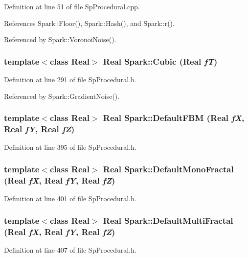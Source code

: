 Definition at line 51 of file Sp\-Procedural.cpp.

References Spark::Floor(), Spark::Hash(), and Spark::r().

Referenced by Spark::Voronoi\-Noise().
\subsubsection{\setlength{\rightskip}{0pt plus 5cm}template$<$class Real$>$ Real Spark::Cubic (Real {\em f\-T})}\label{namespaceSpark_a98}


Definition at line 291 of file Sp\-Procedural.h.

Referenced by Spark::Gradient\-Noise().
\subsubsection{\setlength{\rightskip}{0pt plus 5cm}template$<$class Real$>$ Real Spark::Default\-FBM (Real {\em f\-X}, Real {\em f\-Y}, Real {\em f\-Z})}\label{namespaceSpark_a86}


Definition at line 395 of file Sp\-Procedural.h.
\subsubsection{\setlength{\rightskip}{0pt plus 5cm}template$<$class Real$>$ Real Spark::Default\-Mono\-Fractal (Real {\em f\-X}, Real {\em f\-Y}, Real {\em f\-Z})}\label{namespaceSpark_a87}


Definition at line 401 of file Sp\-Procedural.h.
\subsubsection{\setlength{\rightskip}{0pt plus 5cm}template$<$class Real$>$ Real Spark::Default\-Multi\-Fractal (Real {\em f\-X}, Real {\em f\-Y}, Real {\em f\-Z})}\label{namespaceSpark_a88}


Definition at line 407 of file Sp\-Procedural.h.

